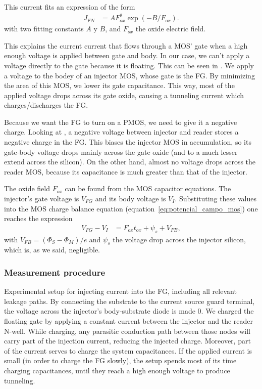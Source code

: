 This current fits an expression of the form
\begin{align*}
    J_{FN} &= AF_{ox}^2\exp(-B/F_{ox}).
\end{align*}
with two fitting constants $A$ y $B$,
and $F_{ox}$ the oxide electric field.

This explains the current current that flows through a MOS' gate
when a high enough voltage is applied between gate and body.
In our case, we can't apply a voltage directly to the gate because it is floating.
This can be seen in .
We apply a voltage to the bodey of an injector MOS,
whose gate is the FG.
By minimizing the area of this MOS,
we lower its gate capacitance.
This way, most of the applied voltage drops across its gate oxide,
causing a tunneling current which charges/discharges the FG.

Because we want the FG to turn on a PMOS,
we need to give it a negative charge.
Looking at ,
a negative voltage between injector and reader
stores a negative charge in the FG.
This biases the injector MOS in accumulation,
so its gate-body voltage drops mainly across the gate oxide
(and to a much lesser extend across the silicon).
On the other hand, almost no voltage drops across the reader MOS,
because its capacitance is much greater than that of the injector.

The oxide field $F_{ox}$ can be found from the MOS capacitor equations.
The injector's gate voltage is $V_{FG}$
and its body voltage is $V_I$.
Substituting these values into the MOS charge balance equation
(equation~\ref{eq:potencial_campo_mos})
one reaches the expression
\begin{align*}
    V_{FG}-V_I &= F_{ox}t_{ox}+\psi_s+V_{FB},
\end{align*}
with $V_{FB}=(\Phi_S-\Phi_M)/e$ 
and $\psi_s$ the voltage drop across the injector silicon,
which is, as we said, negligible.
%
\subsubsection{Measurement procedure}
{Experimental setup for injecting current into the FG,
including all relevant leakage paths.
By connecting the substrate to the current source guard terminal,
the voltage across the injector's body-substrate diode is made 0.}
We charged the floating gate by applying a constant current 
between the injector and the reader N-well.
While charging, any parasitic conduction path between those nodes
will carry part of the injection current,
reducing the injected charge.
Moreover, part of the current serves to charge the system capacitances.
If the applied current is small (in order to charge the FG slowly),
the setup spends most of its time charging capacitances,
until they reach a high enough voltage to produce tunneling.

